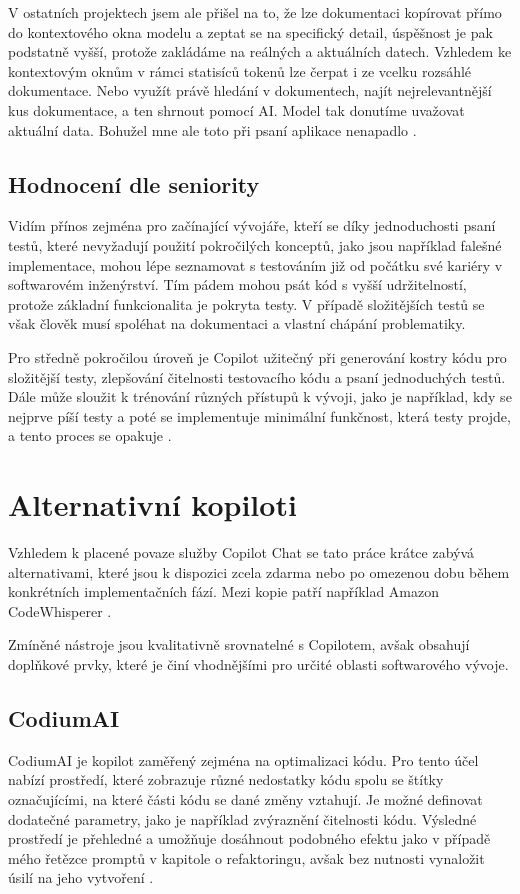 \documentclass[FM,DP]{tulthesis}
\begin{document}
		V ostatních projektech jsem ale přišel na to, že lze dokumentaci kopírovat přímo do kontextového okna modelu a zeptat se na specifický detail, úspěšnost je pak podstatně vyšší, protože zakládáme na reálných a aktuálních datech. Vzhledem ke kontextovým oknům v rámci statisíců tokenů lze čerpat i ze vcelku rozsáhlé dokumentace. Nebo využít právě hledání v dokumentech, najít nejrelevantnější kus dokumentace, a ten shrnout pomocí AI. Model tak donutíme uvažovat aktuální data. Bohužel mne ale toto při psaní aplikace nenapadlo \cite{PEG}.
		
		\subsection{Hodnocení dle seniority}
		Vidím přínos zejména pro začínající vývojáře, kteří se díky jednoduchosti psaní testů, které nevyžadují použití pokročilých konceptů, jako jsou například falešné implementace, mohou lépe seznamovat s testováním již od počátku své kariéry v softwarovém inženýrství. Tím pádem mohou psát kód s vyšší udržitelností, protože základní funkcionalita je pokryta testy. V případě složitějších testů se však člověk musí spoléhat na dokumentaci a vlastní chápání problematiky.
		
		Pro středně pokročilou úroveň je Copilot užitečný při generování kostry kódu pro složitější testy, zlepšování čitelnosti testovacího kódu a psaní jednoduchých testů. Dále může sloužit k trénování různých přístupů k vývoji, jako je například, kdy se nejprve píší testy a poté se implementuje minimální funkčnost, která testy projde, a tento proces se opakuje \cite{TDD}.
		
		\section{Alternativní kopiloti}
		Vzhledem k placené povaze služby Copilot Chat se tato práce krátce zabývá alternativami, které jsou k dispozici zcela zdarma nebo po omezenou dobu během konkrétních implementačních fází. Mezi kopie patří například Amazon CodeWhisperer \cite{codewhisperer}. 
		
		Zmíněné nástroje jsou kvalitativně srovnatelné s Copilotem, avšak obsahují doplňkové prvky, které je činí vhodnějšími pro určité oblasti softwarového vývoje.
		
		\subsection{CodiumAI}
		CodiumAI je kopilot zaměřený zejména na optimalizaci kódu. Pro tento účel nabízí prostředí, které zobrazuje různé nedostatky kódu spolu se štítky označujícími, na které části kódu se dané změny vztahují. Je možné definovat dodatečné parametry, jako je například zvýraznění čitelnosti kódu. Výsledné prostředí je přehledné a umožňuje dosáhnout podobného efektu jako v případě mého řetězce promptů v kapitole o refaktoringu, avšak bez nutnosti vynaložit úsilí na jeho vytvoření \cite{codium}.
		
\end{document}
